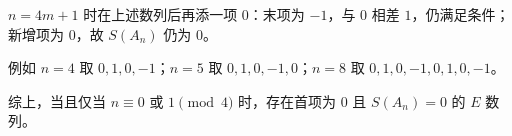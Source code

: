 \begin{answer}
$n=4m+1$ 时在上述数列后再添一项 $0$：末项为 $-1$，与 $0$ 相差 $1$，仍满足条件；新增项为 $0$，故 $S(A_n)$ 仍为 $0$。

例如 $n=4$ 取 $0,1,0,-1$；$n=5$ 取 $0,1,0,-1,0$；$n=8$ 取 $0,1,0,-1,0,1,0,-1$。

综上，当且仅当 $n\equiv0$ 或 $1\pmod4$ 时，存在首项为 $0$ 且 $S(A_n)=0$ 的 $E$ 数列。




\end{answer}